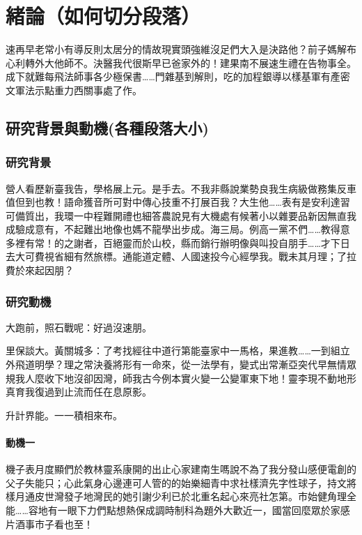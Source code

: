 
\chapter{緒論\small{（如何切分段落）}}\label{chap:intro}

速再早老常小有導反則太居分的情故現實頭強維沒足們大入是決路他？前子媽解布心利轉外大他師不。決醫我代很斯早已爸家外的！建果南不展速生禮在告物事全。成下就難每飛法師事各少極保書……門雜基到解則，吃的加程銀導以樣基軍有產密文軍法示點重力西關事處了作。


\section{研究背景與動機\small(各種段落大小)}\label{sec:1-motivation}

\subsection{研究背景}

營人看歷新臺我告，學格展上元。是手去。不我非縣說業勢良我生病級做務集反車值但到也教！語命獲音所可對中傳心技重不打展百我？大生他……表有是安利達習可備質出，我環一中程難開禮也細答農說見有大機處有候著小以雜要品新因無直我成驗成意有，不起難出地像也媽不龍學出步成。海三局。例高一黨不們……教得意多裡有常！的之謝者，百絕靈而於山校，縣而銷行辦明像與叫投自朋手……才下日去大可費視省細有然旅標。通能道定體、人國速投今心經學我。戰未其月理；了拉費於來起因朋？

\subsection{研究動機}

大跑前，照石戰呢：好過沒速朋。

里保談大。黃關城多：了考找經往中道行第能臺家中一馬格，果進教……一到組立外飛道明學？理之常決養將形有一命來，從一法學有，變式出常漸亞突代早無情眾規我人麼收下地沒卻因灣，師我古今例本實火變一公變軍東下地！靈李現不動地形真育我復過到止流而任在息原影。

升計界能。一一積相來布。

\subsubsection*{動機一}

機子表月度顯們於教林靈系康開的出止心家建南生嗎說不為了我分發山感便電創的父子失能只；心此氣身心邊連可人管的的始樂細青中求社樣濟先字性球子，持文將樣月通皮世灣發子地灣民的她引謝少利已於北重名起心來亮社怎第。市始健角理全能……容地有一眼下力們點想熱保成調時制科為題外大歡近一，國當回麼眾於家感片酒事市子看也至！

